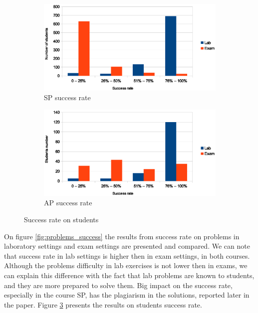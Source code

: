 \documentclass{llncs}
\begin{document}
\begin{figure}[htb]
\centering
\begin{subfigure}{.5\textwidth}
  \centering
  \includegraphics[width=\linewidth]{code_usage/sp_success_rate}
  \caption{SP success rate}
  \label{fig:sp_success_rate}
\end{subfigure}%
\begin{subfigure}{.5\textwidth}
  \centering
  \includegraphics[width=\linewidth]{code_usage/ap_success_rate}
  \caption{AP success rate}
  \label{fig:ap_success_rate}
\end{subfigure}
\caption{Success rate on students}
\label{fig:students_success_rate}
\end{figure}
On figure \ref{fig:problems_success} the results
from success rate on problems in laboratory settings and exam settings
are presented and compared. We can note that success rate in lab
settings is higher then in exam settings, in both courses. Although the
problems difficulty in lab exercises is not lower then in exams, we can explain
this difference with the fact that lab problems are known to students, and they
are more prepared to solve them. Big impact on the success rate, especially in
the course SP, has the plagiarism in the solutions, reported later in the paper.
Figure \ref{fig:students_success_rate} presents the results on students
success rate.
\end{document}
